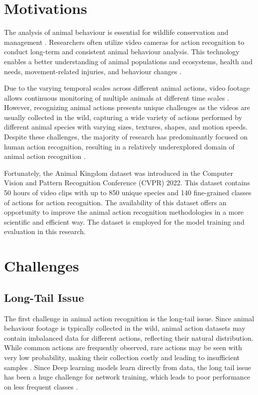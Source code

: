 \section{Motivations}
The analysis of animal behaviour is essential for wildlife conservation and management \parencite{Greggor2019, singh2020animal}. Researchers often utilize video cameras for action recognition to conduct long-term and consistent animal behaviour analysis. This technology enables a better understanding of animal populations and ecosystems, health and needs, movement-related injuries, and behaviour changes \parencite{ng2022animal, Giersberg:2022aa, 8259762}.

Due to the varying temporal scales across different animal actions, video footage allows continuous monitoring of multiple animals at different time scales \parencite{ANDERSON201418}. However, recognizing animal actions presents unique challenges as the videos are usually collected in the wild, capturing a wide variety of actions performed by different animal species with varying sizes, textures, shapes, and motion speeds. Despite these challenges, the majority of research has predominantly focused on human action recognition, resulting in a relatively underexplored domain of animal action recognition \parencite{mondal2023msqnet}.

Fortunately, the Animal Kingdom dataset \parencite{ng2022animal} was introduced in the Computer Vision and Pattern Recognition Conference (CVPR) 2022. This dataset contains 50 hours of video clips with up to 850 unique species and 140 fine-grained classes of actions for action recognition. The availability of this dataset offers an opportunity to improve the animal action recognition methodologies in a more scientific and efficient way. The dataset is employed for the model training and evaluation in this research.

\section{Challenges}
\subsection{Long-Tail Issue}
The first challenge in animal action recognition is the long-tail issue. Since animal behaviour footage is typically collected in the wild, animal action datasets may contain imbalanced data for different actions, reflecting their natural distribution. While 
common actions are frequently observed, rare actions may be seen with very low probability, making their collection costly and leading to insufficient samples \parencite{ng2022animal, perrett2023use}. Since Deep learning models learn directly from data, the long tail issue has been a huge challenge for network training, which leads to poor performance on less frequent classes \parencite{cao2019learning, zhang2021videolt}.

